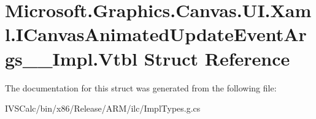 \hypertarget{struct_microsoft_1_1_graphics_1_1_canvas_1_1_u_i_1_1_xaml_1_1_i_canvas_animated_update_event_args_____impl_1_1_vtbl}{}\section{Microsoft.\+Graphics.\+Canvas.\+U\+I.\+Xaml.\+I\+Canvas\+Animated\+Update\+Event\+Args\+\_\+\+\_\+\+Impl.\+Vtbl Struct Reference}
\label{struct_microsoft_1_1_graphics_1_1_canvas_1_1_u_i_1_1_xaml_1_1_i_canvas_animated_update_event_args_____impl_1_1_vtbl}


The documentation for this struct was generated from the following file\+:\begin{DoxyCompactItemize}
\item 
I\+V\+S\+Calc/bin/x86/\+Release/\+A\+R\+M/ilc/Impl\+Types.\+g.\+cs\end{DoxyCompactItemize}
